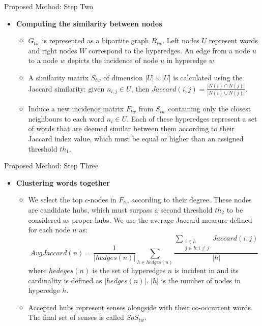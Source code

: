 \documentclass[10pt,=table]{beamer}
\begin{document}
\begin{frame}{Proposed Method: Step Two}
\begin{itemize}

\item \textbf{Computing the similarity between nodes}
	\begin{itemize}
		\item $G_{tw}$ is represented as a bipartite graph $B_{tw}$. Left nodes $U$ represent words and right nodes $W$ correspond to the hyperedges. An edge from a node $u$ to a node $w$ depicts the incidence of node $u$ in hyperedge $w$.
		
		\item A similarity matrix $S_{tw}$ of dimension $|U|\times|U|$ is calculated using the Jaccard similarity: given $n_{i,j} \in U$, then $Jaccard(i,j)=\frac{|N(i)\cap N(j)|}{|N(i)\cup N(j)|}$.
	
		
		\item Induce a new incidence matrix $F_{tw}$ from $S_{tw}$ containing only the closest neighbours to each word $n_i \in U$. Each of these hyperedges represent a set of words that are deemed similar between them according to their Jaccard index value, which must be equal or higher than an assigned threshold $th_1$.
		
	\end{itemize}
\end{itemize}
\end{frame}


\begin{frame}{Proposed Method: Step Three}
\begin{itemize}
	\item \textbf{Clustering words together}
	\begin{itemize}
		\item We select the top $c$-nodes in $F_{tw}$ according to their degree. These nodes are candidate hubs, which must surpass a second threshold $th_2$ to be considered as proper hubs. We use the average Jaccard measure defined for each node $n$ as: $$AvgJaccard(n)=\frac{1}{|hedges(n)|}\sum_{h\in hedges(n)}\frac{\sum_{\substack{i\in h\\j\in h;i\neq j}}Jaccard(i,j)}{|h|}$$ 
		where $hedeges(n)$ is the set of hyperedges $n$ is incident in and its cardinality is defined as $|hedges(n)|$. $|h|$ is the number of nodes in hyperedge $h$. 
		\item Accepted hubs represent senses alongside with their co-occurrent words. The final set of senses is called $SoS_{tw}$.
	\end{itemize}

\end{itemize}
\end{frame}
\end{document}
